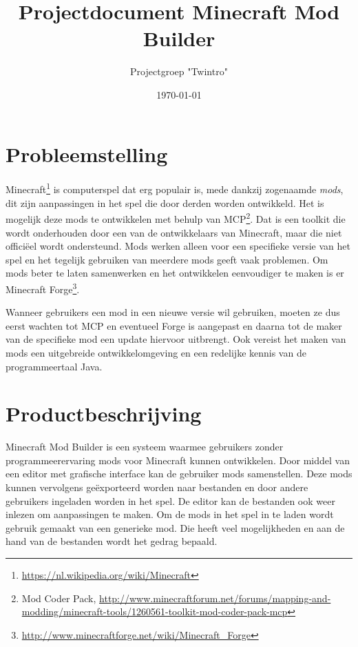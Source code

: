 \documentclass{article}
\begin{document}
\title{Projectdocument Minecraft Mod Builder}
\author{Projectgroep "Twintro"}
\date{\today}

\maketitle

\tableofcontents

\newpage

\section{Probleemstelling}
	Minecraft\footnote{\url{https://nl.wikipedia.org/wiki/Minecraft}} is computerspel dat erg populair is, mede dankzij zogenaamde \emph{mods}, dit zijn aanpassingen in het spel die door derden worden ontwikkeld. Het is mogelijk deze mods te ontwikkelen met behulp van MCP\footnote{Mod Coder Pack, \url{http://www.minecraftforum.net/forums/mapping-and-modding/minecraft-tools/1260561-toolkit-mod-coder-pack-mcp}}. Dat is een toolkit die wordt onderhouden door een van de ontwikkelaars van Minecraft, maar die niet offici\"eel wordt ondersteund. Mods werken alleen voor een specifieke versie van het spel en het tegelijk gebruiken van meerdere mods geeft vaak problemen. Om mods beter te laten samenwerken en het ontwikkelen eenvoudiger te maken is er Minecraft Forge\footnote{\url{http://www.minecraftforge.net/wiki/Minecraft_Forge}}.
	
	Wanneer gebruikers een mod in een nieuwe versie wil gebruiken, moeten ze dus eerst wachten tot MCP en eventueel Forge is aangepast en daarna tot de maker van de specifieke mod een update hiervoor uitbrengt. Ook vereist het maken van mods een uitgebreide ontwikkelomgeving en een redelijke kennis van de programmeertaal Java.

\section{Productbeschrijving}
	Minecraft Mod Builder is een systeem waarmee gebruikers zonder programmeerervaring mods voor Minecraft kunnen ontwikkelen. Door middel van een editor met grafische interface kan de gebruiker mods samenstellen. Deze mods kunnen vervolgens ge\"exporteerd worden naar bestanden en door andere gebruikers ingeladen worden in het spel. De editor kan de bestanden ook weer inlezen om aanpassingen te maken. Om de mods in het spel in te laden wordt gebruik gemaakt van een generieke mod. Die heeft veel mogelijkheden en aan de hand van de bestanden wordt het gedrag bepaald.
	
\end{document}

